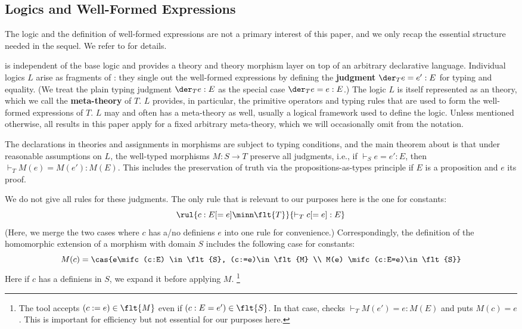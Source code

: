\subsection{Logics and Well-Formed Expressions}
The logic and the definition of well-formed expressions are not a primary interest of this paper, and we only recap the essential structure needed in the sequel.
We refer to \cite{rabe:howto:14} for details.

\mmt is independent of the base logic and provides a theory and theory morphism layer on top of an arbitrary declarative language.
Individual logics $L$ arise as fragments of \mmt: they single out the well-formed expressions by defining the \textbf{judgment} $\der_T e=e':E$ for typing and equality.
(We treat the plain typing judgment $\der_T e:E$ as the special case $\der_T e=e:E$.)
The logic $L$ is itself represented as an \mmt theory, which we call the \textbf{meta-theory} of $T$.
$L$ provides, in particular, the primitive operators and typing rules that are used to form the well-formed expressions of $T$.
$L$ may and often has a meta-theory as well, usually a logical framework used to define the logic. 
Unless mentioned otherwise, all results in this paper apply for a fixed arbitrary meta-theory, which we will occasionally omit from the notation.

The declarations in theories and assignments in morphisms are subject to typing conditions, and the main theorem about \mmt is that under reasonable assumptions on $L$, the well-typed morphisms $M:S\to T$ preserve all judgments, i.e., if $\vdash_S e=e':E$, then $\vdash_T M(e)=M(e'):M(E)$.
This includes the preservation of truth via the propositions-as-types principle if $E$ is a proposition and $e$ its proof.

We do not give all rules for these judgments.
The only rule that is relevant to our purposes here is the one for constants:
\[\rul{c:E[=e] \minn \flt{T}}{\vdash_T c[=e]:E}\]
(Here, we merge the two cases where $c$ has a/no definiens $e$ into one rule for convenience.)
Correspondingly, the definition of the homomorphic extension of a morphism with domain $S$ includes the following case for constants:
\[M(c) = \cas{e\mifc (c:E) \in \flt{S}, (c:=e)\in\flt{M} \\ M(e) \mifc (c:E=e)\in \flt{S}}\]
Here if $c$ has a definiens in $S$, we expand it before applying $M$.%
\footnote{The \mmt tool accepts $(c:=e)\in \flt{M}$ even if $(c:E=e')\in\flt{S}$. In that case, \mmt checks $\vdash_T M(e')=e:M(E)$ and puts $M(c)=e$. This is important for efficiency but not essential for our purposes here.}

